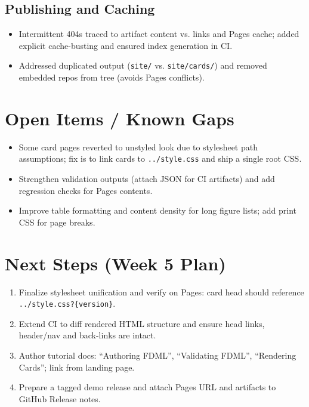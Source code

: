 \documentclass[11pt,a4paper]{article}
\begin{document}
\subsection{Publishing and Caching}
\begin{itemize}[leftmargin=1.2em]
  \item Intermittent 404s traced to artifact content vs. links and Pages cache; added explicit cache-busting and ensured index generation in CI.
  \item Addressed duplicated output (\texttt{site/} vs. \texttt{site/cards/}) and removed embedded repos from tree (avoids Pages conflicts).
\end{itemize}

\section{Open Items / Known Gaps}
\begin{itemize}[leftmargin=1.2em]
  \item Some card pages reverted to unstyled look due to stylesheet path assumptions; fix is to link cards to \texttt{../style.css} and ship a single root CSS.
  \item Strengthen validation outputs (attach JSON for CI artifacts) and add regression checks for Pages contents.
  \item Improve table formatting and content density for long figure lists; add print CSS for page breaks.
\end{itemize}

\section{Next Steps (Week 5 Plan)}
\begin{enumerate}[leftmargin=1.2em]
  \item Finalize stylesheet unification and verify on Pages: card head should reference \texttt{../style.css?\{version\}}.
  \item Extend CI to diff rendered HTML structure and ensure head links, header/nav and back-links are intact.
  \item Author tutorial docs: ``Authoring FDML'', ``Validating FDML'', ``Rendering Cards''; link from landing page.
  \item Prepare a tagged demo release and attach Pages URL and artifacts to GitHub Release notes.
\end{enumerate}
\end{document}
